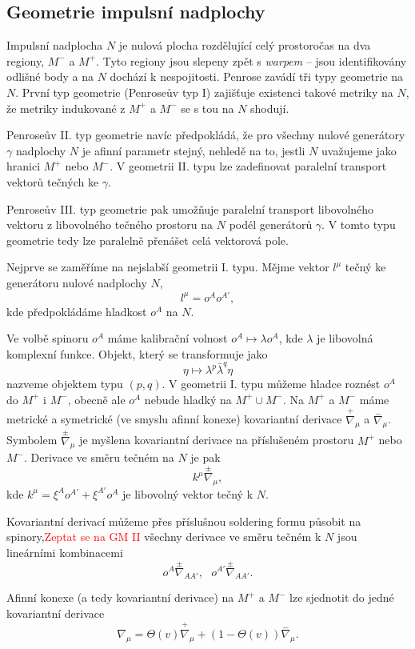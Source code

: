 \subsection{Geometrie impulsní nadplochy}

Impulsní nadplocha $N$ je nulová plocha rozdělující celý prostoročas na dva regiony, $M^-$ a $M^+$.
Tyto regiony jsou slepeny zpět s \emph{warpem} -- jsou identifikovány odlišné body a na $N$ dochází k
nespojitosti. Penrose zavádí tři typy geometrie na $N$.
První typ geometrie (Penroseův typ I) zajišťuje existenci takové metriky na $N$, že metriky indukované z $M^+$ a $M^-$
se s tou na $N$ shodují.

Penroseův II. typ geometrie navíc předpokládá, že pro všechny nulové generátory $\gamma$ nadplochy $N$
je afinní parametr stejný, nehledě na to, jestli $N$ uvažujeme jako hranici $M^+$ nebo $M^-$.
V geometrii II. typu lze zadefinovat paralelní transport vektorů tečných ke $\gamma$.

Penroseův III. typ geometrie pak umožňuje paralelní transport libovolného vektoru z libovolného tečného prostoru
na $N$ podél generátorů $\gamma$. V tomto typu geometrie tedy lze paralelně přenášet celá vektorová pole.

Nejprve se zaměříme na nejslabší geometrii I. typu. Mějme vektor $l^\mu$ tečný ke generátoru
nulové nadplochy $N$,
\begin{equation}
    l^\mu = o^A o^{A'},
\end{equation}
kde předpokládáme hladkost $o^A$ na $N$.

Ve volbě spinoru $o^A$ máme kalibrační volnost $o^A \mapsto \lambda o^A$, kde $\lambda$ je libovolná komplexní funkce.
Objekt, který se transformuje jako
\begin{equation}
    \eta \mapsto \lambda^p \bar{\lambda}^q \eta
\end{equation}
nazveme objektem typu $(p, q)$. V geometrii I. typu můžeme hladce roznést $o^A$ do
$M^+$ i $M^-$, obecně ale $o^A$ nebude hladký na $M^+ \cup M^-$. Na $M^+$ a $M^-$ máme
metrické a symetrické (ve smyslu afinní konexe) kovariantní derivace $\stackrel{+}{\nabla}_\mu$ a $\stackrel{-}{\nabla}_\mu$. Symbolem
$\stackrel{\pm}{\nabla}_\mu$ je myšlena kovariantní derivace na příslušeném prostoru $M^+$ nebo $M^-$.
Derivace ve směru tečném na $N$ je pak
\begin{equation}
    k^\mu \stackrel{\pm}{\nabla}_\mu,
\end{equation}
kde $k^\mu = \xi^A o^{A'} + \xi^{A'} o^A$ je libovolný vektor tečný k $N$.

Kovariantní derivací můžeme přes příslušnou soldering formu působit na spinory,\textcolor{red}{Zeptat se na GM II}
všechny derivace ve směru tečném k $N$ jsou lineárními kombinacemi
\begin{equation}
    o^A \stackrel{\pm}{\nabla}_{AA'}, ~~~ o^{A'} \stackrel{\pm}{\nabla}_{AA'}.
\end{equation}

Afinní konexe (a tedy kovariantní derivace) na $M^+$ a $M^-$ lze sjednotit do jedné kovariantní derivace
\begin{equation}
    \nabla_\mu = \Theta(v) \stackrel{+}{\nabla}_\mu + (1-\Theta(v)) \stackrel{-}{\nabla}_\mu.
\end{equation}

